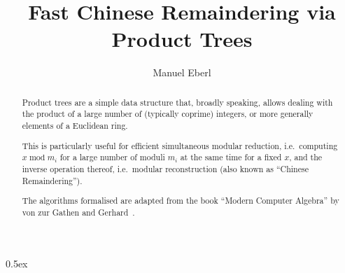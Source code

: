 \documentclass[11pt,a4paper]{article}
\begin{document}
\title{Fast Chinese Remaindering via Product Trees}
\author{Manuel Eberl}
\maketitle

\begin{abstract}
Product trees are a simple data structure that, broadly speaking, allows dealing with the product
of a large number of (typically coprime) integers, or more generally elements of a Euclidean ring.

This is particularly useful for efficient simultaneous 
modular reduction, i.e.\ computing $x\mathbin{\text{mod}} m_i$ for a large number of moduli $m_i$ at the
same time for a fixed $x$, and the inverse operation thereof, i.e.\ modular reconstruction 
(also known as ``Chinese Remaindering'').

The algorithms formalised are adapted from the book ``Modern Computer Algebra'' by von zur
Gathen and Gerhard~\cite[Chapter 10]{gathen}.
\end{abstract}

\tableofcontents

\newpage
\parindent 0pt\parskip 0.5ex



\raggedright


\end{document}
